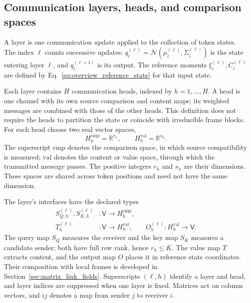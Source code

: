 \documentclass[twoside,11pt]{article}
\begin{document}
\subsection{Communication layers, heads, and comparison spaces}
\label{sec:role_measurements}

A layer is one communication update applied to the collection of token states. The index \(\ell\) counts successive updates: \(q_i^{(\ell)}=\mathcal N(\mu_i^{(\ell)},\Sigma_i^{(\ell)})\) is the state entering layer \(\ell\), and \(q_i^{(\ell+1)}\) is its output. The reference moments \(\xi_i^{(\ell)},C_i^{(\ell)}\) are defined by Eq.~\eqref{eq:overview_reference_state} for that input state.

Each layer contains \(H\) communication heads, indexed by \(h=1,\ldots,H\). A head is one channel with its own source comparison and content maps; its weighted messages are combined with those of the other heads. This definition does not require the heads to partition the state or coincide with irreducible frame blocks. For each head choose two real vector spaces,
\begin{equation}
H_h^{\mathrm{cmp}}=\mathbb R^{r_h},
\qquad
H_h^{\mathrm{val}}=\mathbb R^{s_h}.
\label{eq:head_channel_spaces}
\end{equation}
The superscript \(\mathrm{cmp}\) denotes the comparison space, in which source compatibility is measured; \(\mathrm{val}\) denotes the content or value space, through which the transmitted message passes. The positive integers \(r_h\) and \(s_h\) are their dimensions. These spaces are shared across token positions and need not have the same dimension.

The layer's interfaces have the declared types
\begin{align}
S_{Q,h}^{(\ell)},S_{K,h}^{(\ell)}
&:\mathsf V\longrightarrow H_h^{\mathrm{cmp}},\\
T_h^{(\ell)}&:\mathsf V\longrightarrow H_h^{\mathrm{val}},
\qquad
O_h^{(\ell)}:H_h^{\mathrm{val}}\longrightarrow\mathsf V.
\label{eq:head_interface_types}
\end{align}
The query map \(S_Q\) measures the receiver and the key map \(S_K\) measures a candidate sender; both have full row rank, hence \(r_h\le K\). The value map \(T\) extracts content, and the output map \(O\) places it in reference state coordinates. Their composition with local frames is developed in Section~\ref{sec:matrix_link_fields}. Superscripts \((\ell,h)\) identify a layer and head, and layer indices are suppressed when one layer is fixed. Matrices act on column vectors, and \(ij\) denotes a map from sender \(j\) to receiver \(i\).
\end{document}
